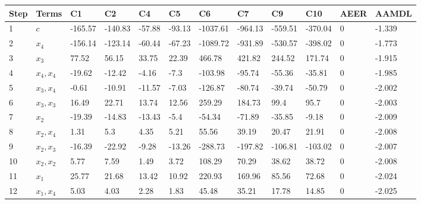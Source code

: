 \begin{tabular}{llllllllllll}
Step & Terms & C1 & C2 & C4 & C5 & C6 & C7 & C9 & C10 & AEER & AAMDL \\ 
\hline 
1 & $c$ & -165.57 & -140.83 & -57.88 & -93.13 & -1037.61 & -964.13 & -559.51 & -370.04 & 0 & -1.339 \\ 
2 & $x_4$ & -156.14 & -123.14 & -60.44 & -67.23 & -1089.72 & -931.89 & -530.57 & -398.02 & 0 & -1.773 \\ 
3 & $x_3$ & 77.52 & 56.15 & 33.75 & 22.39 & 466.78 & 421.82 & 244.52 & 171.74 & 0 & -1.915 \\ 
4 & $x_4,x_4$ & -19.62 & -12.42 & -4.16 & -7.3 & -103.98 & -95.74 & -55.36 & -35.81 & 0 & -1.985 \\ 
5 & $x_3,x_4$ & -0.61 & -10.91 & -11.57 & -7.03 & -126.87 & -80.74 & -39.74 & -50.79 & 0 & -2.002 \\ 
6 & $x_3,x_3$ & 16.49 & 22.71 & 13.74 & 12.56 & 259.29 & 184.73 & 99.4 & 95.7 & 0 & -2.003 \\ 
7 & $x_2$ & -19.39 & -14.83 & -13.43 & -5.4 & -54.34 & -71.89 & -35.85 & -9.18 & 0 & -2.009 \\ 
8 & $x_2,x_4$ & 1.31 & 5.3 & 4.35 & 5.21 & 55.56 & 39.19 & 20.47 & 21.91 & 0 & -2.008 \\ 
9 & $x_2,x_3$ & -16.39 & -22.92 & -9.28 & -13.26 & -288.73 & -197.82 & -106.81 & -103.02 & 0 & -2.007 \\ 
10 & $x_2,x_2$ & 5.77 & 7.59 & 1.49 & 3.72 & 108.29 & 70.29 & 38.62 & 38.72 & 0 & -2.008 \\ 
11 & $x_1$ & 25.77 & 21.68 & 13.42 & 10.92 & 220.93 & 169.96 & 85.56 & 72.68 & 0 & -2.024 \\ 
12 & $x_1,x_4$ & 5.03 & 4.03 & 2.28 & 1.83 & 45.48 & 35.21 & 17.78 & 14.85 & 0 & -2.025 \\ 
\hline 
\end{tabular}
